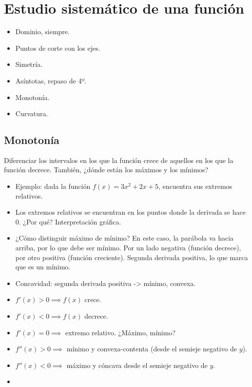 \section{Estudio sistemático de una función}

\begin{itemize}
	\item Dominio, siempre.
	\item Puntos de corte con los ejes.
	\item Simetría.
	\item Asíntotas, repaso de 4º.
	\item Monotonía.
	\item Curvatura.
\end{itemize}

\subsection{Monotonía}

Diferenciar los intervalos en los que la función crece de aquellos en los que la función decrece. También, ¿dónde están los máximos y los mínimos?

\begin{itemize}
	\item Ejemplo: dada la función $f(x) = 3x^2+2x+5$, encuentra sus extremos relativos.
	\item Los extremos relativos se encuentran en los puntos donde la derivada se hace 0. ¿Por qué? Interpretación gráfica.
	\item ¿Cómo distinguir máximo de mínimo? En este caso, la parábola va hacia arriba, por lo que debe ser mínimo. 
	\subitem Por un lado negativa (función decrece), por otro positiva (función creciente).
	\subitem Segunda derivada positiva, lo que marca que es un mínimo.
	\item Concavidad: segunda derivada positiva -> mínimo, convexa.
\end{itemize}

\begin{itemize}
	\item $f'(x) > 0 \implies f(x)$ crece. 
	\item $f'(x) < 0 \implies f(x)$ decrece. 
	\item $f'(x) = 0 \implies $ extremo relativo. ¿Máximo, mínimo?
	\item $f''(x) > 0 \implies $ mínimo y convexa-contenta (desde el semieje negativo de $y$).
	\item $f''(x) < 0 \implies $ máximo y cóncava desde el semieje negativo de $y$.
	\item 
\end{itemize}


